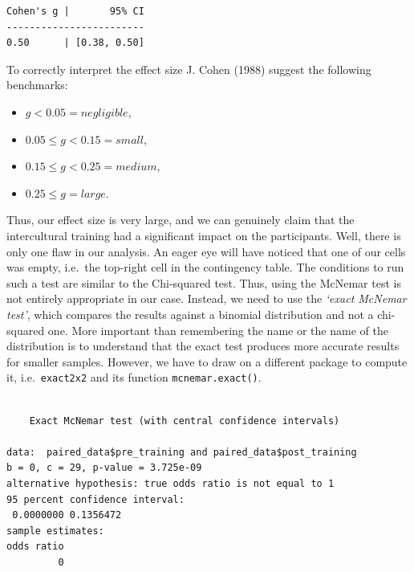 \documentclass[
  letterpaper,
]{krantz}
\makeatletter
\newenvironment{Shaded}{\begin{snugshade}}{\end{snugshade}}
\newcommand{\FunctionTok}[1]{\textcolor[rgb]{0.28,0.35,0.67}{#1}}
\newcommand{\NormalTok}[1]{\textcolor[rgb]{0.00,0.23,0.31}{#1}}
\newcommand{\SpecialCharTok}[1]{\textcolor[rgb]{0.37,0.37,0.37}{#1}}
\newenvironment{kframe}{%
\medskip{}
\setlength{\fboxsep}{.8em}
 \def\at@end@of@kframe{}%
 \ifinner\ifhmode%
  \def\at@end@of@kframe{\end{minipage}}%
  \begin{minipage}{\columnwidth}%
 \fi\fi%
 \def\FrameCommand##1{\hskip\@totalleftmargin \hskip-\fboxsep
 \colorbox{shadecolor}{##1}\hskip-\fboxsep
     \hskip-\linewidth \hskip-\@totalleftmargin \hskip\columnwidth}%
 \MakeFramed {\advance\hsize-\width
   \@totalleftmargin\z@ \linewidth\hsize
   \@setminipage}}%
 {\par\unskip\endMakeFramed%
 \at@end@of@kframe}
\renewenvironment{Shaded}{\begin{kframe}}{\end{kframe}}
\makeatother
\begin{document}
\begin{verbatim}
Cohen's g |       95% CI
------------------------
0.50      | [0.38, 0.50]
\end{verbatim}

To correctly interpret the effect size J. Cohen (1988) suggest the
following benchmarks:

\begin{itemize}
\item
  \(g < 0.05 = negligible\),
\item
  \(0.05 \leq g < 0.15 = small\),
\item
  \(0.15 \leq g < 0.25 = medium\),
\item
  \(0.25 \leq g = large\).
\end{itemize}

Thus, our effect size is very large, and we can genuinely claim that the
intercultural training had a significant impact on the participants.
Well, there is only one flaw in our analysis. An eager eye will have
noticed that one of our cells was empty, i.e.~the top-right cell in the
contingency table. The conditions to run such a test are similar to the
Chi-squared test. Thus, using the McNemar test is not entirely
appropriate in our case. Instead, we need to use the \emph{`exact
McNemar test'}, which compares the results against a binomial
distribution and not a chi-squared one. More important than remembering
the name or the name of the distribution is to understand that the exact
test produces more accurate results for smaller samples. However, we
have to draw on a different package to compute it,
i.e.~\texttt{exact2x2} and its function \texttt{mcnemar.exact()}.

\begin{Shaded}
\end{Shaded}

\begin{verbatim}

    Exact McNemar test (with central confidence intervals)

data:  paired_data$pre_training and paired_data$post_training
b = 0, c = 29, p-value = 3.725e-09
alternative hypothesis: true odds ratio is not equal to 1
95 percent confidence interval:
 0.0000000 0.1356472
sample estimates:
odds ratio 
         0 
\end{verbatim}
\end{document}
